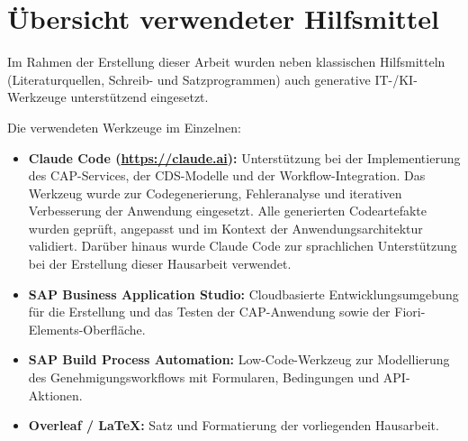 \section*{Übersicht verwendeter Hilfsmittel}

Im Rahmen der Erstellung dieser Arbeit wurden neben klassischen Hilfsmitteln (Literaturquellen, Schreib- und Satzprogrammen) auch generative IT-/KI-Werkzeuge unterstützend eingesetzt.

\medskip
Die verwendeten Werkzeuge im Einzelnen:

\begin{itemize}
  \item \textbf{Claude Code (\url{https://claude.ai}):}
  Unterstützung bei der Implementierung des CAP-Services, der CDS-Modelle und der Workflow-Integration. Das Werkzeug wurde zur Codegenerierung, Fehleranalyse und iterativen Verbesserung der Anwendung eingesetzt. Alle generierten Codeartefakte wurden geprüft, angepasst und im Kontext der Anwendungsarchitektur validiert. Darüber hinaus wurde Claude Code zur sprachlichen Unterstützung bei der Erstellung dieser Hausarbeit verwendet.

  \item \textbf{SAP Business Application Studio:}
  Cloudbasierte Entwicklungsumgebung für die Erstellung und das Testen der CAP-Anwendung sowie der Fiori-Elements-Oberfläche.

  \item \textbf{SAP Build Process Automation:}
  Low-Code-Werkzeug zur Modellierung des Genehmigungsworkflows mit Formularen, Bedingungen und API-Aktionen.

  \item \textbf{Overleaf / \LaTeX{}:}
  Satz und Formatierung der vorliegenden Hausarbeit.
\end{itemize}
